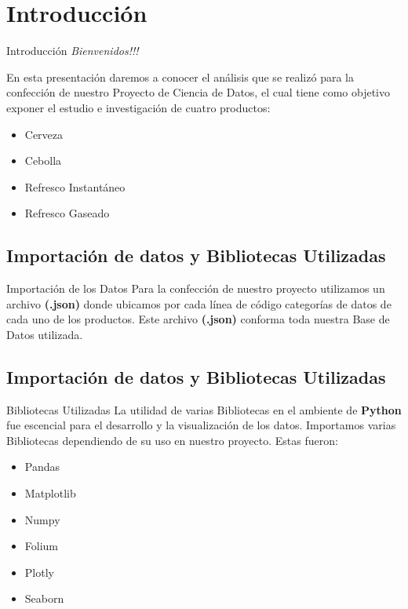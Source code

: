\section{Introducción}\label{intro}
\begin{frame}[fragile]{Introducción}
  \textit{\LARGE Bienvenidos!!!}


  En esta presentación daremos a conocer el análisis que se realizó para la confección de nuestro Proyecto de Ciencia de Datos,
  el cual tiene como objetivo exponer el estudio e investigación de cuatro productos:
\begin{itemize}
  \item Cerveza
  \item Cebolla
  \item Refresco Instantáneo
  \item Refresco Gaseado
\end{itemize}
  
\end{frame}

\subsection{Importación de datos y Bibliotecas Utilizadas}

\begin{frame}{Importación de los Datos}
Para la confección de nuestro proyecto utilizamos un archivo \textbf{(.json)} donde ubicamos por cada línea 
de código categorías de datos de cada uno de los productos. Este archivo \textbf{(.json)} conforma toda nuestra Base de Datos
utilizada.
\end{frame}


\subsection{Importación de datos y Bibliotecas Utilizadas}
\begin{frame}{Bibliotecas Utilizadas}
La utilidad de varias Bibliotecas en el ambiente de \textbf{Python} fue escencial
para el desarrollo y la visualización de los datos. Importamos varias Bibliotecas dependiendo de su uso 
en nuestro proyecto.
Estas fueron:
\begin{itemize}
  \item Pandas
  \item Matplotlib
  \item Numpy
  \item Folium
  \item Plotly
  \item Seaborn 
\end{itemize} 
\end{frame}


